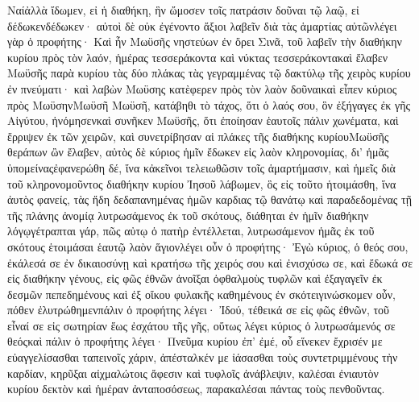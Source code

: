 Ναίἀλλὰ ἴδωμεν, εἰ ἡ διαθήκη, ἣν ὤμοσεν τοῖς πατράσιν δοῦναι τῷ λαῷ, εἰ δέδωκενδέδωκεν· αὐτοὶ δὲ οὐκ ἐγένοντο ἄξιοι λαβεῖν διὰ τὰς ἁμαρτίας αὐτῶνλέγει γὰρ ὁ προφήτης· Καὶ ἦν Μωϋσῆς νηστεύων ἐν ὄρει Σινᾶ, τοῦ λαβεῖν τὴν διαθήκην κυρίου πρὸς τὸν λαόν, ἡμέρας τεσσεράκοντα καὶ νύκτας τεσσεράκοντακαὶ ἔλαβεν Μωϋσῆς παρὰ κυρίου τὰς δύο πλάκας τὰς γεγραμμένας τῷ δακτύλῳ τῆς χειρὸς κυρίου ἐν πνεύματι· καὶ λαβὼν Μωϋσης κατὲφερεν πρὸς τὸν λαὸν δοῦναικαὶ εἶπεν κύριος πρὸς ΜωϋσηνΜωϋσῆ Μωϋσῆ, κατάβηθι τὸ τάχος, ὅτι ὁ λαός σου, ὃν ἐξήγαγες ἐκ γῆς Αἰγύτου, ἠνόμησενκαὶ συνῆκεν Μωϋσῆς, ὅτι ἐποίησαν ἑαυτοῖς πάλιν χωνέματα, καὶ ἔρριψεν ἐκ τῶν χειρῶν, καὶ συνετρίβησαν αἱ πλάκες τῆς διαθήκης κυρίουΜωϋσῆς θεράπων ὢν ἔλαβεν, αὐτὸς δὲ κύριος ἡμῖν ἔδωκεν εἰς λαὸν κληρονομίας, δι’ ἡμᾶς ὑπομείναςἐφανερώθη δέ, ἵνα κἀκεῖνοι τελειωθῶσιν τοῖς ἁμαρτήμασιν, καὶ ἡμεῖς διὰ τοῦ κληρονομοῦντος διαθήκην κυρίου Ἰησοῦ λάβωμεν, ὃς εἰς τοῦτο ἡτοιμάσθη, ἵνα ἀυτὸς φανείς, τὰς ἤδη δεδαπανημένας ἡμῶν καρδιας τῷ θανάτῳ καὶ παραδεδομένας τῇ τῆς πλάνης ἀνομίᾳ λυτρωσάμενος ἐκ τοῦ σκότους, διάθηται ἐν ἡμῖν διαθήκην λόγῳγέτραπται γάρ, πῶς αὐτῳ ὁ πατὴρ ἐντέλλεται, λυτρωσάμενον ἡμᾶς ἐκ τοῦ σκότους ἑτοιμάσαι ἑαυτῷ λαὸν ἅγιονλέγει οὖν ὁ προφήτης· Ἐγὼ κύριος, ὁ θεός σου, ἐκάλεσά σε ἐν δικαιοσύνῃ καὶ κρατήσω τῆς χειρός σου καὶ ἐνισχύσω σε, καὶ ἔδωκά σε εἰς διαθήκην γένους, εἰς φῶς ἐθνῶν ἀνοῖξαι ὀφθαλμοὺς τυφλῶν καὶ ἐξαγαγεῖν ἐκ δεσμῶν πεπεδημένους καὶ ἐξ οἴκου φυλακῆς καθημένους ἐν σκότειγινώσκομεν οὖν, πόθεν ἐλυτρώθημενπάλιν ὁ προφήτης λέγει· Ἰδού, τέθεικά σε εἰς φῶς ἐθνῶν, τοῦ εἶναί σε εἰς σωτηρίαν ἕως ἐσχάτου τῆς γῆς, οὕτως λέγει κύριος ὁ λυτρωσάμενός σε θεόςκαὶ πάλιν ὁ προφήτης λέγει· Πνεῦμα κυρίου ἐπ’ ἐμέ, οὗ εἵνεκεν ἔχρισέν με εὐαγγελίσασθαι ταπεινοῖς χάριν, ἀπέσταλκέν με ἰάσασθαι τοὺς συντετριμμένους τὴν καρδίαν, κηρῦξαι αἰχμαλώτοις ἄφεσιν καὶ τυφλοῖς ἀνάβλεψιν, καλέσαι ἐνιαυτὸν κυρίου δεκτὸν καὶ ἡμέραν ἀνταποσόσεως, παρακαλέσαι πάντας τοὺς πενθοῦντας.
